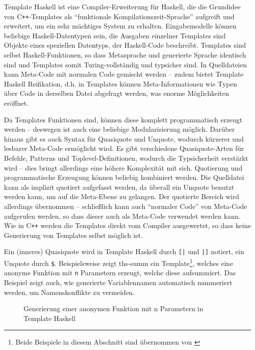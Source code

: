 \documentclass[11pt, a4paper, bibgerm]{scrbook}
\newenvironment{DIFnomarkup}{}{}
\newcommand\icode[1]{\lstinline?#1?}
\newcommand\abb{}
\newcommand{\cpp}{C\texttt{++}}
\begin{document}
Template Haskell ist eine Compiler-Erweiterung für Haskell, die die
Grundidee von \cpp{}-Templates als "`funktionale
Kompilationszeit-Sprache"' aufgreift und erweitert, um ein sehr
mächtiges System zu erhalten. Eingabemodelle können beliebige
Haskell-Datentypen sein, die Ausgaben einzelner Templates sind Objekte
eines speziellen Datentyps, der Haskell-Code beschreibt. Templates sind
selbst Haskell-Funktionen, so dass Metasprache und generierte Sprache
identisch sind und Templates somit Turing-vollständig und typsicher
sind. In Quelldateien kann Meta-Code mit normalen Code gemischt werden
-- zudem bietet Template Haskell Reifikation, d.h. in Templates können
Meta-Informationen wie Typen über Code in derselben Datei abgefragt
werden, was enorme Möglichkeiten eröffnet.

Da Templates Funktionen sind, können diese komplett programmatisch
erzeugt werden -- deswegen ist auch eine beliebige Modularisierung
möglich. Darüber hinaus gibt es auch Syntax für Quasiquote und Unquote,
wodurch kürzerer und lesbarer Meta-Code ermöglicht wird. Es gibt
verschiedene Quasiquote-Arten für Befehle, Patterns und
Toplevel-Definitionen, wodurch die Typsicherheit verstärkt wird -- dies
bringt allerdings eine höhere Komplexität mit sich. Quotierung und
programmatische Erzeugung können beliebig kombiniert werden. Die
Quelldatei kann als implizit quotiert aufgefasst werden, da überall ein
Unquote benutzt werden kann, um auf die Meta-Ebene zu gelangen. Der
quotierte Bereich wird allerdings übernommen -- schließlich kann auch
"`normaler Code"' von Meta-Code aufgerufen werden, so dass dieser auch
als Meta-Code verwendet werden kann. Wie in \cpp{} werden die Templates
direkt vom Compiler ausgewertet, so dass keine Generierung von Templates
selbst möglich ist.

Ein (inneres) Quasiquote wird in Template Haskell durch \icode{[|} und
  \icode{|]} notiert, ein Unquote durch \icode{$}. %
Beispielsweise zeigt \abb{ths-summ} ein Template\footnote{Beide
  Beispiele in diesem Abschnitt sind übernommen von \cite{ThsTutorial}}, welches eine anonyme
Funktion mit \icode{n} Parametern erzeugt, welche diese aufsummiert. Das
Beispiel zeigt auch, wie generierte Variablennamen automatisch
nummeriert werden, um Namenskonflikte zu vermeiden.

\begin{figure}[h]
  \centering
\begin{DIFnomarkup}\end{DIFnomarkup} %
  \caption{Generierung einer anonymen Funktion mit n Parametern in Template Haskell}
  \label{magicl:fig:ths-summ}
\end{figure}
\end{document}
